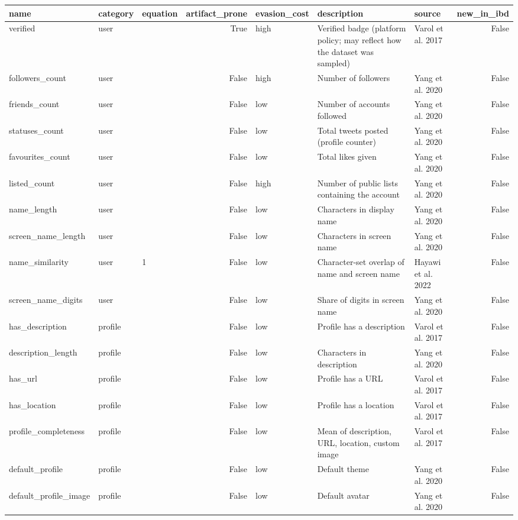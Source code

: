 \begin{tabular}{lllrlllr}
\toprule
name & category & equation & artifact_prone & evasion_cost & description & source & new_in_ibd \\
\midrule
verified & user &  & True & high & Verified badge (platform policy; may reflect how the dataset was sampled) & Varol et al. 2017 & False \\
followers_count & user &  & False & high & Number of followers & Yang et al. 2020 & False \\
friends_count & user &  & False & low & Number of accounts followed & Yang et al. 2020 & False \\
statuses_count & user &  & False & low & Total tweets posted (profile counter) & Yang et al. 2020 & False \\
favourites_count & user &  & False & low & Total likes given & Yang et al. 2020 & False \\
listed_count & user &  & False & high & Number of public lists containing the account & Yang et al. 2020 & False \\
name_length & user &  & False & low & Characters in display name & Yang et al. 2020 & False \\
screen_name_length & user &  & False & low & Characters in screen name & Yang et al. 2020 & False \\
name_similarity & user & 1 & False & low & Character-set overlap of name and screen name & Hayawi et al. 2022 & False \\
screen_name_digits & user &  & False & low & Share of digits in screen name & Yang et al. 2020 & False \\
has_description & profile &  & False & low & Profile has a description & Varol et al. 2017 & False \\
description_length & profile &  & False & low & Characters in description & Yang et al. 2020 & False \\
has_url & profile &  & False & low & Profile has a URL & Varol et al. 2017 & False \\
has_location & profile &  & False & low & Profile has a location & Varol et al. 2017 & False \\
profile_completeness & profile &  & False & low & Mean of description, URL, location, custom image & Varol et al. 2017 & False \\
default_profile & profile &  & False & low & Default theme & Yang et al. 2020 & False \\
default_profile_image & profile &  & False & low & Default avatar & Yang et al. 2020 & False \\

\end{tabular}
